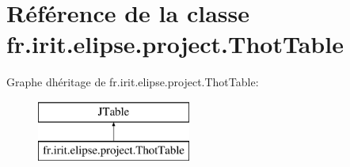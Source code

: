 \hypertarget{classfr_1_1irit_1_1elipse_1_1project_1_1_thot_table}{}\section{Référence de la classe fr.\+irit.\+elipse.\+project.\+Thot\+Table}
\label{classfr_1_1irit_1_1elipse_1_1project_1_1_thot_table}
Graphe d\textquotesingle{}héritage de fr.\+irit.\+elipse.\+project.\+Thot\+Table\+:\begin{figure}[H]
\begin{center}
\leavevmode
\includegraphics[height=2.000000cm]{classfr_1_1irit_1_1elipse_1_1project_1_1_thot_table}
\end{center}
\end{figure}
